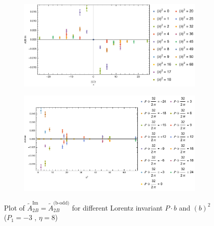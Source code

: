\documentclass[]{article}
\numberwithin{equation}{section}
\newcommand{\tAmp}{\widetilde{A}}
\newcommand{\tAmp}{\ensuremath{\widetilde{A}^{(+)}}}
\begin{document}
\begin{figure}[h!]
     \centering
     \begin{subfigure}[b]{0.45\textwidth}
         \centering
         \includegraphics[width=\textwidth]{Amp_plots/bP_A2B_b_odd_P1_-3_eta_8.pdf}
     \end{subfigure}
     \begin{subfigure}[b]{0.45\textwidth}
         \centering
         \includegraphics[width=\textwidth]{Amp_plots/bsq_A2B_b_odd_P1_-3_eta_8.pdf}
     \end{subfigure}
        \caption{Plot of $\tAmp^{\text{Im}}_{2B}=\tAmp^{\text{(b-odd)}}_{2B}$ for different Lorentz invariant $P\cdot b$ and $(b)^2$  ($P_{1} = -3$ , $\eta=8$)}
\end{figure}
\end{document}
